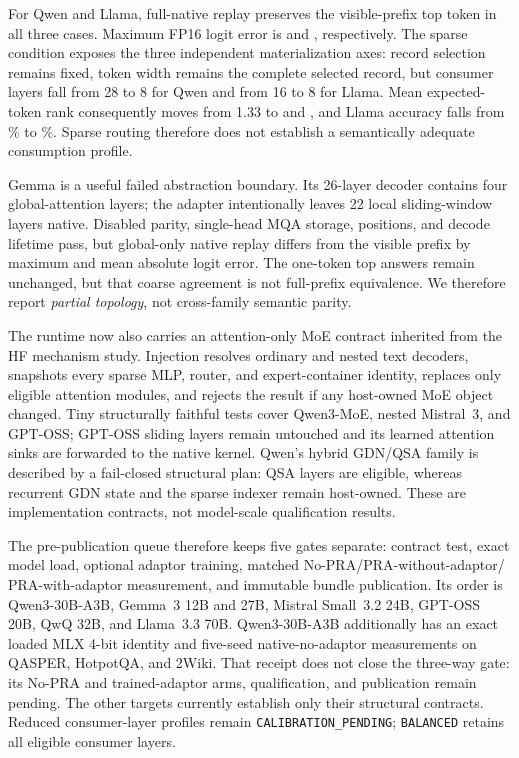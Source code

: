 \documentclass[11pt]{article}
\begin{document}
For Qwen and Llama, full-native replay preserves the visible-prefix top token
in all three cases. Maximum FP16 logit error is \QwenFullMaxError{} and
\LlamaFullMaxError{}, respectively. The sparse condition exposes the three
independent materialization axes: record selection remains fixed, token width
remains the complete selected record, but consumer layers fall from 28 to 8
for Qwen and from 16 to 8 for Llama. Mean expected-token rank consequently
moves from 1.33 to \QwenSparseRank{} and \LlamaSparseRank{}, and Llama accuracy
falls from \LlamaSelectedAccuracy{}\% to \LlamaSparseAccuracy{}\%. Sparse
routing therefore does not establish a semantically adequate consumption
profile.

Gemma is a useful failed abstraction boundary. Its 26-layer decoder contains
four global-attention layers; the adapter intentionally leaves 22 local
sliding-window layers native. Disabled parity, single-head MQA storage,
positions, and decode lifetime pass, but global-only native replay differs from
the visible prefix by \GemmaFullMaxError{} maximum and \GemmaFullMeanError{}
mean absolute logit error. The one-token top answers remain unchanged, but that
coarse agreement is not full-prefix equivalence. We therefore report
\emph{partial topology}, not cross-family semantic parity.

The runtime now also carries an attention-only MoE contract inherited from the
HF mechanism study.  Injection resolves ordinary and nested text decoders,
snapshots every sparse MLP, router, and expert-container identity, replaces
only eligible attention modules, and rejects the result if any host-owned MoE
object changed.  Tiny structurally faithful tests cover Qwen3-MoE, nested
Mistral~3, and GPT-OSS; GPT-OSS sliding layers remain untouched and its learned
attention sinks are forwarded to the native kernel.  Qwen's hybrid GDN/QSA
family is described by a fail-closed structural plan: QSA layers are eligible,
whereas recurrent GDN state and the sparse indexer remain host-owned.  These
are implementation contracts, not model-scale qualification results.

The pre-publication queue therefore keeps five gates separate: contract test,
exact model load, optional adaptor training, matched No-PRA/PRA-without-adaptor/
PRA-with-adaptor measurement, and immutable bundle publication.  Its order is
Qwen3-30B-A3B, Gemma~3 12B and 27B, Mistral Small~3.2 24B, GPT-OSS 20B,
QwQ 32B, and Llama~3.3 70B.  Qwen3-30B-A3B additionally has an exact loaded
MLX 4-bit identity and five-seed native-no-adaptor measurements on QASPER,
HotpotQA, and 2Wiki.  That receipt does not close the three-way gate: its
No-PRA and trained-adaptor arms, qualification, and publication remain
pending.  The other targets currently establish only their structural
contracts.  Reduced consumer-layer profiles remain
\texttt{CALIBRATION\_PENDING}; \texttt{BALANCED} retains all eligible consumer
layers.
\end{document}
